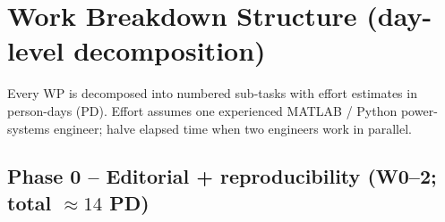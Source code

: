\documentclass[11pt,a4paper]{article}
\begin{document}
\section{Work Breakdown Structure (day-level decomposition)}

Every WP is decomposed into numbered sub-tasks with effort estimates in
person-days (PD).  Effort assumes one experienced MATLAB / Python power-systems
engineer; halve elapsed time when two engineers work in parallel.

\subsection{Phase 0 -- Editorial + reproducibility (W0--2; total $\approx 14$ PD)}
\end{document}
